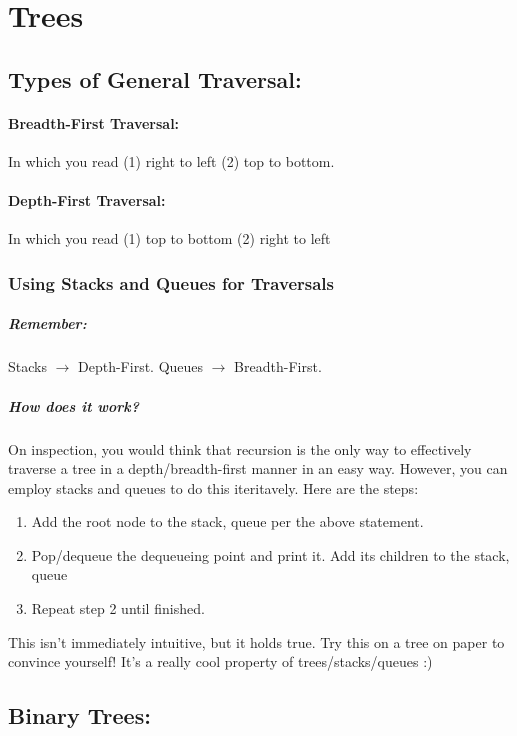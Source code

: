\documentclass[a4paper,12pt]{report}
\begin{document}
\chapter{Trees}
\section{Types of General Traversal:}
\subsubsection{Breadth-First Traversal: }
In which you read (1) right to left (2) top to bottom.
\subsubsection{Depth-First Traversal: }
In which you read (1) top to bottom (2) right to left

\subsection{Using Stacks and Queues for Traversals}
\paragraph{Remember: } Stacks $\to$ Depth-First. Queues $\to$ Breadth-First. 
\paragraph{How does it work?}
On inspection, you would think that recursion is the only way to effectively traverse a tree in a depth/breadth-first manner in an easy way. However, you can employ stacks and queues to do this iteritavely. Here are the steps:
\begin{enumerate}
\item Add the root node to the {stack, queue} per the above statement.
\item Pop/dequeue the dequeueing point and print it. Add its children to the {stack, queue}
\item Repeat step 2 until finished. 
\end{enumerate}
This isn't immediately intuitive, but it holds true. Try this on a tree on paper to convince yourself! It's a really cool property of trees/stacks/queues :)

\section{Binary Trees: }
\end{document}
